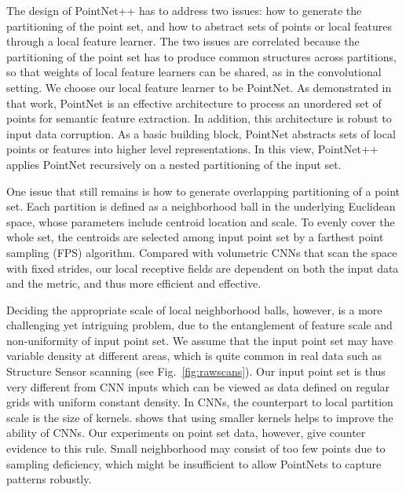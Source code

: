 The design of PointNet++ has to address two issues: how to generate the partitioning of the point set, and how to abstract sets of points or local features through a local feature learner. The two issues are correlated because the partitioning of the point set has to produce common structures across partitions, so that weights of local feature learners can be shared, as in the convolutional setting. We choose our local feature learner to be PointNet. As demonstrated in that work, PointNet is an effective architecture to process an unordered set of points for semantic feature extraction. In addition, this architecture is robust to input data corruption. As a basic building block, PointNet abstracts sets of local points or features into higher level representations. In this view, PointNet++ applies PointNet recursively on a nested partitioning of the input set. 

One issue that still remains is how to generate overlapping partitioning of a point set. Each partition is defined as a neighborhood ball in the underlying Euclidean space, whose parameters include centroid location and scale. To evenly cover the whole set, the centroids are selected among input point set by a farthest point sampling (FPS) algorithm. Compared with volumetric CNNs that scan the space with fixed strides, our local receptive fields are dependent on both the input data and the metric, and thus more efficient and effective. 

Deciding the appropriate scale of local neighborhood balls, however, is a more challenging yet intriguing problem, due to the entanglement of feature scale and non-uniformity of input point set. We assume that the input point set may have variable density at different areas, which is quite common in real data such as Structure Sensor scanning \cite{occipital2016structure} (see Fig.~\ref{fig:rawscans}).  Our input point set is thus very different from CNN inputs which can be viewed as data defined on regular grids with uniform constant density. In CNNs, the counterpart to local partition scale is the size of kernels. \cite{simonyan2014very} shows that using smaller kernels helps to improve the ability of CNNs. Our experiments on point set data, however, give counter evidence to this rule. Small neighborhood may consist of too few points due to sampling deficiency, which might be insufficient to allow PointNets to capture patterns robustly. 

